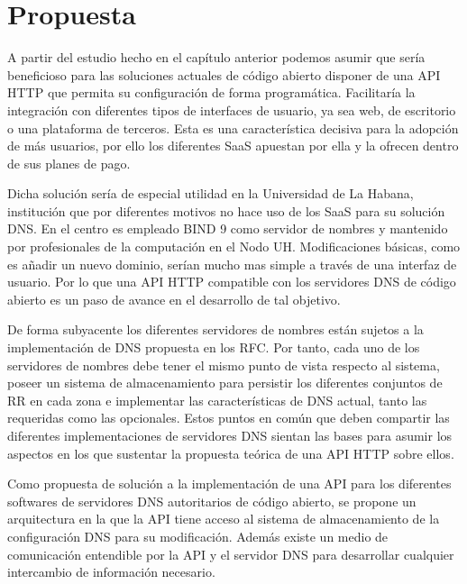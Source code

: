 \chapter{Propuesta}\label{chapter:proposal}

A partir del estudio hecho en el capítulo anterior podemos asumir que sería beneficioso para las soluciones actuales de código abierto disponer de una API HTTP que permita su configuración de forma programática. Facilitaría la integración con diferentes tipos de interfaces de usuario, ya sea web, de escritorio o una plataforma de terceros. Esta es una característica decisiva para la adopción de más usuarios, por ello los diferentes SaaS apuestan por ella y la ofrecen dentro de sus planes de pago.

Dicha solución sería de especial utilidad en la Universidad de La Habana, institución que por diferentes motivos no hace uso de los SaaS para su solución DNS. En el centro es empleado BIND 9 como servidor de nombres y mantenido por profesionales de la computación en el Nodo UH. Modificaciones básicas, como es añadir un nuevo dominio, serían mucho mas simple a través de una interfaz de usuario. Por lo que una API HTTP compatible con los servidores DNS de código abierto es un paso de avance en el desarrollo de tal objetivo.

De forma subyacente los diferentes servidores de nombres están sujetos a la implementación de DNS propuesta en los RFC. Por tanto, cada uno de los servidores de nombres debe tener el mismo punto de vista respecto al sistema, poseer un sistema de almacenamiento para persistir los diferentes conjuntos de RR en cada zona e implementar las características de DNS actual, tanto las requeridas como las opcionales. Estos puntos en común que deben compartir las diferentes implementaciones de servidores DNS sientan las bases para asumir los aspectos en los que sustentar la propuesta teórica de una API HTTP sobre ellos.

Como propuesta de solución a la implementación de una API para los diferentes softwares de servidores DNS autoritarios de código abierto, se propone un arquitectura en la que la API tiene acceso al sistema de almacenamiento de la configuración DNS para su modificación. Además existe un medio de comunicación entendible por la API y el servidor DNS para desarrollar cualquier intercambio de información necesario.

